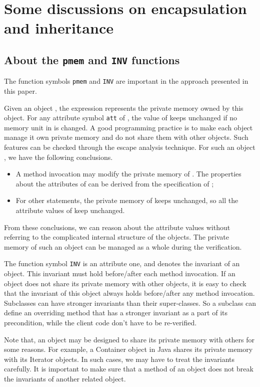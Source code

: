 \documentclass[fleqn]{llncs}
\begin{document}
\section{Some discussions on encapsulation and inheritance}\label{SEC-DISCUSSION}

\subsection{About the \texttt{pmem} and \texttt{INV} functions}\label{PMEM-INV}
The function symbols \texttt{pmem} and \texttt{INV} are important in the approach presented in this paper.

Given an object , the expression  represents the private memory owned by this object.
For any attribute symbol \texttt{att} of , the value of  keeps unchanged if no memory unit in  is changed.
A good programming practice is to make each object manage it own private memory and do not share them with other objects.
Such features can be checked through the escape analysis technique\cite{ESCAPE-ANALYSIS}.
For such an object , we have the following conclusions.
\begin{itemize}
\item A method invocation  may modify the private memory of . The properties about the attributes of  can be derived from the specification of ;
\item For other statements, the private memory of  keeps unchanged, so all the attribute values of  keep unchanged.
\end{itemize}
From these conclusions, we can reason about the attribute values without referring to the complicated internal structure of the objects.
The private memory of such an object can be managed as a whole during the verification.

The function symbol \texttt{INV} is an attribute one, and denotes the invariant of an object.
This invariant must hold before/after each method invocation. If an object does not share its private memory with other objects, it is easy to
check that the invariant of this object always holds before/after any method invocation.
Subclasses can have stronger invariants than their super-classes. So a subclass can define an overriding method that has a stronger invariant as a part of
its precondition, while the client code don't have to be re-verified.


Note that, an object may be designed to share its private memory with others for some reasons. For example, a Container object in Java shares
its private memory with its Iterator objects. In such cases, we may have to treat the invariants carefully. It is important to make sure that
a method of an object does not break the invariants of another related object.
\end{document}
